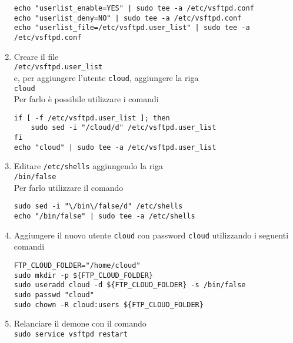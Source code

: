 \documentclass[a4paper,twoside,10pt,openany]{scrbook}
\begin{document}
\begin{enumerate}
\begin{verbatim}
echo "userlist_enable=YES" | sudo tee -a /etc/vsftpd.conf
echo "userlist_deny=NO" | sudo tee -a /etc/vsftpd.conf
echo "userlist_file=/etc/vsftpd.user_list" | sudo tee -a /etc/vsftpd.conf
\end{verbatim}
% 
\item Creare il file\\
      \texttt{/etc/vsftpd.user\_list}\\
      e, per aggiungere l'utente \texttt{cloud}, aggiungere la riga\\
      \texttt{cloud}\\
      Per farlo è possibile utilizzare i comandi
\begin{verbatim}
if [ -f /etc/vsftpd.user_list ]; then
    sudo sed -i "/cloud/d" /etc/vsftpd.user_list
fi
echo "cloud" | sudo tee -a /etc/vsftpd.user_list
\end{verbatim}
\item Editare \texttt{/etc/shells} aggiungendo la riga\\
      \texttt{/bin/false}\\
      Per farlo utilizzare il comando
\begin{verbatim}
sudo sed -i "\/bin\/false/d" /etc/shells
echo "/bin/false" | sudo tee -a /etc/shells
\end{verbatim}
\item Aggiungere il nuovo utente \texttt{cloud} con password \texttt{cloud} utilizzando i seguenti comandi
\begin{verbatim}
FTP_CLOUD_FOLDER="/home/cloud" 
sudo mkdir -p ${FTP_CLOUD_FOLDER}
sudo useradd cloud -d ${FTP_CLOUD_FOLDER} -s /bin/false
sudo passwd "cloud"
sudo chown -R cloud:users ${FTP_CLOUD_FOLDER}
\end{verbatim}
% 
% 
% 
 \item Relanciare il demone con il comando\\
       \texttt{sudo service vsftpd restart}
\end{enumerate}
%
%
\end{document}
